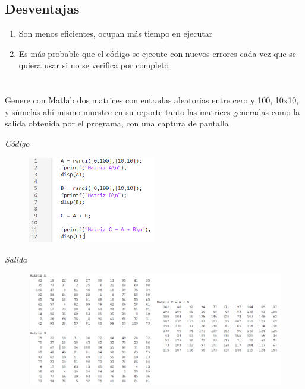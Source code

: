 \documentclass[12pt,oneside]{book}
\begin{document}
\subsection*{Desventajas}
\begin{enumerate}
    \item Son menos eficientes, ocupan más tiempo en ejecutar
    \item Es más probable que el código se ejecute con nuevos errores cada vez que se quiera usar si no se verifica por completo
\end{enumerate}

\section[Ejercicio]{}
{\large Genere con Matlab dos matrices con entradas aleatorias entre cero y 100,
10x10, y súmelas ahí mismo muestre en su reporte tanto las matrices
generadas como la salida obtenida por el programa, con una captura de
pantalla}

\textit{Código}

\begin{figure}[H]
    \centering
    \includegraphics[width = 0.5\textwidth]{figura1}
\end{figure}

\newpage

\textit{Salida}

\begin{figure}[H]
    \centering
    \includegraphics[width = 1\textwidth]{figura2}
\end{figure}
\end{document}
